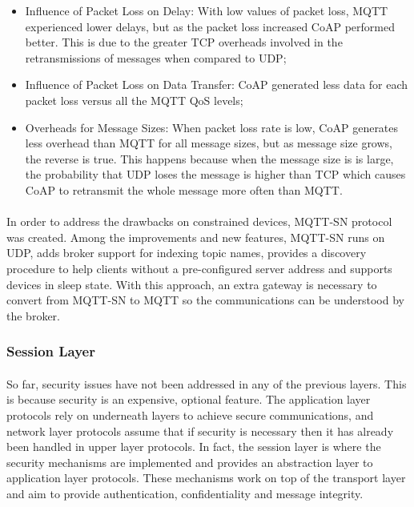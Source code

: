 \begin{itemize}
	\item Influence of Packet Loss on Delay: With low values of packet loss, \ac{MQTT} experienced lower delays, but as the packet loss increased \ac{CoAP} performed better. This is due to the greater \ac{TCP} overheads involved in the retransmissions of messages when compared to \ac{UDP};\\
	\item Influence of Packet Loss on Data Transfer: \ac{CoAP} generated less data for each packet loss versus all the \ac{MQTT} \ac{QoS} levels;\\
	\item Overheads for Message Sizes: When packet loss rate is low, \ac{CoAP} generates less overhead than \ac{MQTT} for all message sizes, but as message size grows, the reverse is true. This happens because when the message size is is large, the probability that \ac{UDP} loses the message is higher than \ac{TCP} which causes \ac{CoAP} to retransmit the whole message more often than \ac{MQTT}.
\end{itemize}

\paragraph{}
	In order to address the drawbacks on constrained devices, \ac{MQTT-SN} protocol \cite{Ibm2013} was created. Among the improvements and new features, \ac{MQTT-SN} runs on UDP, adds broker support for indexing topic names, provides a discovery procedure to help clients without a pre-configured server address and supports devices in sleep state. With this approach, an extra gateway is necessary to convert from \ac{MQTT-SN} to \ac{MQTT} so the communications can be understood by the broker.

\subsubsection{Session Layer}

\paragraph{}
So far, security issues have not been addressed in any of the previous layers. This is because security is an expensive, optional feature. The application layer protocols rely on underneath layers to achieve secure communications, and network layer protocols assume that if security is necessary then it has already been handled in upper layer protocols. In fact, the session layer is where the security mechanisms are implemented and provides an abstraction layer to application layer protocols. These mechanisms work on top of the transport layer and aim to provide authentication, confidentiality and message integrity.

